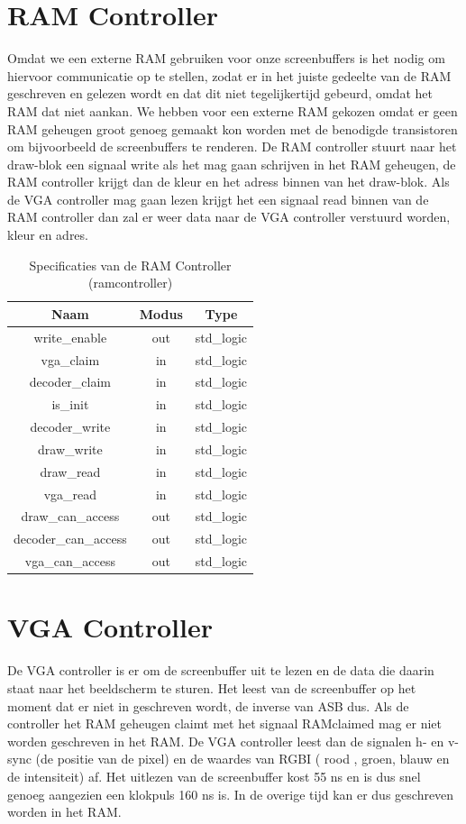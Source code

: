 \documentclass{scrreprt} %
\begin{document}
\section{RAM Controller}
Omdat we een externe RAM gebruiken voor onze screenbuffers is het nodig om hiervoor communicatie op te stellen, zodat er in het juiste gedeelte van de RAM geschreven en gelezen wordt en dat dit niet tegelijkertijd gebeurd, omdat het RAM dat niet aankan. We hebben voor een externe RAM gekozen omdat er geen RAM geheugen groot genoeg gemaakt kon worden met de benodigde transistoren om bijvoorbeeld de screenbuffers te renderen. De RAM controller stuurt naar het draw-blok een signaal write als het mag gaan schrijven in het RAM geheugen, de RAM controller krijgt dan de kleur en het adress binnen van het draw-blok. Als de VGA controller mag gaan lezen krijgt het een signaal read binnen van de RAM controller dan zal er weer data naar de VGA controller verstuurd worden, kleur en adres.

\begin{table}[H]
\centering
\caption{Specificaties van de RAM Controller (ramcontroller)}
\label{tab:spec-ramcontroller}
\begin{tabular}{c c c}
	\hline\hline
 	Naam & Modus & Type\\
 	\hline	
	write\_enable & out & std\_logic\\
	vga\_claim & in & std\_logic\\
	decoder\_claim & in & std\_logic\\
	is\_init & in & std\_logic\\
	decoder\_write & in & std\_logic\\
	draw\_write & in & std\_logic\\
	draw\_read & in & std\_logic\\
	vga\_read & in & std\_logic\\
	draw\_can\_access & out & std\_logic\\
	decoder\_can\_access & out & std\_logic\\
	vga\_can\_access & out & std\_logic\\
  	\hline
\end{tabular}
\end{table}

\section{VGA Controller}
De VGA controller is er om de screenbuffer uit te lezen en de data die daarin staat naar het beeldscherm te sturen. Het leest van de screenbuffer op het moment dat er niet in geschreven wordt, de inverse van ASB dus. Als de controller het RAM geheugen claimt met het signaal RAMclaimed mag er niet worden geschreven in het RAM. De VGA controller leest dan de signalen h- en v-sync (de positie van de pixel) en de waardes van RGBI ( rood , groen, blauw en de intensiteit) af. Het uitlezen van de screenbuffer kost 55 ns en is dus snel genoeg aangezien een klokpuls 160 ns is. In de overige tijd kan er dus geschreven worden in het RAM.
\end{document}

